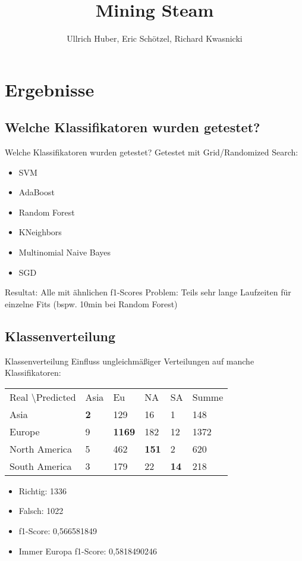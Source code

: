\documentclass[10pt,a4paper]{beamer}
\begin{document}
\author{Ullrich Huber, Eric Schötzel, Richard Kwasnicki}

\title{Mining Steam}

\begin{frame}
  \titlepage
\end{frame}

\section{Ergebnisse}
\subsection{Welche Klassifikatoren wurden getestet?}
\begin{frame}[fragile]{Welche Klassifikatoren wurden getestet?}
Getestet mit Grid/Randomized Search:
\begin{itemize}
\item SVM 
\item AdaBoost
\item Random Forest
\item KNeighbors
\item Multinomial Naive Bayes
\item SGD
\end{itemize}

Resultat: Alle mit ähnlichen f1-Scores
Problem: Teils sehr lange Laufzeiten für einzelne Fits (bspw. 10min bei Random Forest)
\end{frame}
\subsection{Klassenverteilung}
\begin{frame}[fragile]{Klassenverteilung}
Einfluss ungleichmäßiger Verteilungen auf manche Klassifikatoren: \\
\begin{tabular}{|l|l|l|l|l|l|}
\hline
Real \textbackslash Predicted & Asia & Eu & NA & SA & Summe\\
Asia & \textbf{2} & 129 & 16 & 1 & 148 \\
Europe & 9 & \textbf{1169} & 182 & 12 & 1372 \\
North America & 5 & 462 & \textbf{151} &2 & 620 \\
South America & 3 & 179 & 22 & \textbf{14} & 218 \\
\hline
\end{tabular}
\begin{itemize}
\item Richtig: 1336
\item Falsch: 1022
\item f1-Score: 0,566581849
\item Immer Europa f1-Score: 0,5818490246
\end{itemize}				

\end{frame}
\end{document}
